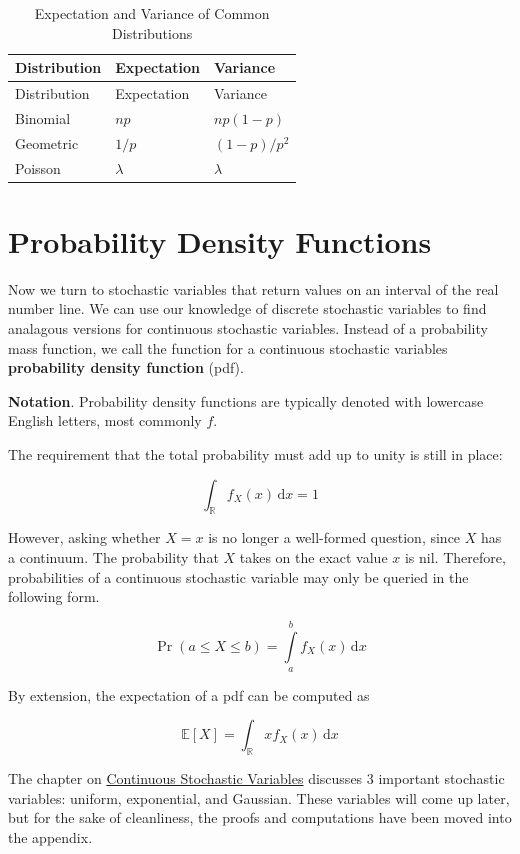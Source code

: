 \documentclass[13pt,oneside]{tufte-book}
\theoremstyle{definition}
\theoremstyle{definition}
\theoremstyle{definition}
\theoremstyle{remark}
\begin{document}
\begin{longtable}[]{@{}lll@{}}
\caption{Expectation and Variance of Common
Distributions}\tabularnewline
\toprule
Distribution & Expectation & Variance\tabularnewline
\midrule
\endfirsthead
\toprule
Distribution & Expectation & Variance\tabularnewline
\midrule
\endhead
Binomial & \(np\) & \(np(1-p)\)\tabularnewline
Geometric & \(1/p\) & \((1-p)/p^2\)\tabularnewline
Poisson & \(\lambda\) & \(\lambda\)\tabularnewline
\bottomrule
\end{longtable}

\section{Probability Density
Functions}\label{probability-density-functions}

Now we turn to stochastic variables that return values on an interval of
the real number line. We can use our knowledge of discrete stochastic
variables to find analagous versions for continuous stochastic
variables. Instead of a probability mass function, we call the function
for a continuous stochastic variables \textbf{probability density
function} (pdf).

\begin{marginfigure}
\textbf{Notation}. Probability density functions are typically denoted
with lowercase English letters, most commonly \(f\).
\end{marginfigure}

The requirement that the total probability must add up to unity is still
in place:

\[
\int_{\mathbb{R}} f_X(x)\,\mathrm{d}x=1
\]

However, asking whether \(X=x\) is no longer a well-formed question,
since \(X\) has a continuum. The probability that \(X\) takes on the
exact value \(x\) is nil. Therefore, probabilities of a continuous
stochastic variable may only be queried in the following form.

\[
\Pr(a\leq X \leq b) = \int\limits_{a}^{b}f_X(x)\,\mathrm{d}x
\]

By extension, the expectation of a pdf can be computed as

\[
\mathbb{E}[X] = \int_{\mathbb{R}}xf_X(x)\,\mathrm{d}x
\]

The chapter on
\protect\hyperlink{continuous-stochastic-variables}{Continuous
Stochastic Variables} discusses 3 important stochastic variables:
uniform, exponential, and Gaussian. These variables will come up later,
but for the sake of cleanliness, the proofs and computations have been
moved into the appendix.
\end{document}
